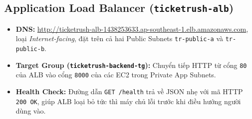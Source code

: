 \subsection{Application Load Balancer (\texttt{ticketrush-alb})}
\begin{itemize}[leftmargin=1.5em]
  \item \textbf{DNS:} \url{http://ticketrush-alb-1438253633.ap-southeast-1.elb.amazonaws.com}, loại \textit{Internet-facing}, đặt trên cả hai Public Subnets \texttt{tr-public-a} và \texttt{tr-public-b}.
  \item \textbf{Target Group (\texttt{ticketrush-backend-tg}):} Chuyển tiếp HTTP từ cổng \texttt{80} của ALB vào cổng \texttt{8000} của các EC2 trong Private App Subnets.
  \item \textbf{Health Check:} Đường dẫn \texttt{GET /health} trả về JSON nhẹ  với mã HTTP \texttt{200 OK}, giúp ALB loại bỏ tức thì máy chủ lỗi trước khi điều hướng người dùng vào.
\end{itemize}

